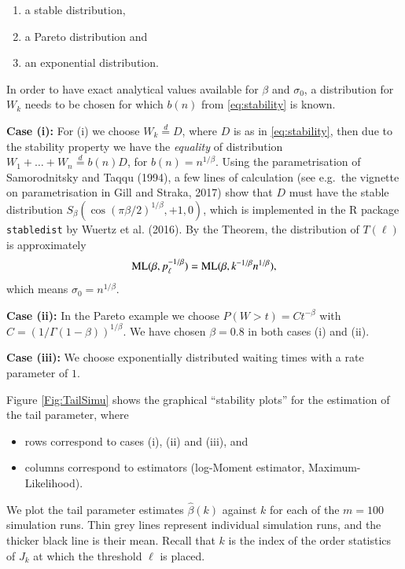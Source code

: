 \documentclass[]{elsarticle} %
\providecommand{\tightlist}{%
  \setlength{\itemsep}{0pt}\setlength{\parskip}{0pt}}
\begin{document}
\begin{enumerate}
\def\labelenumi{(\roman{enumi})}
\item
  a stable distribution,
\item
  a Pareto distribution and
\item
  an exponential distribution.
\end{enumerate}

In order to have exact analytical values available for \(\beta\) and
\(\sigma_0\), a distribution for \(W_k\) needs to be chosen for which
\(b(n)\) from \eqref{eq:stability} is known.

\textbf{Case (i):} For (i) we choose \(W_k \stackrel{d}{=} D\), where
\(D\) is as in \eqref{eq:stability}, then due to the stability property
we have the \emph{equality} of distribution
\(W_1 + \ldots + W_n \stackrel{d}{=} b(n) D\), for
\(b(n) = n^{1/\beta}\). Using the parametrisation of Samorodnitsky and
Taqqu (1994), a few lines of calculation (see e.g.~the vignette on
parametrisation in Gill and Straka, 2017) show that \(D\) must have the
stable distribution \(S_\beta(\cos(\pi \beta/2)^{1/\beta}, +1, 0)\),
which is implemented in the R package \texttt{stabledist} by Wuertz et
al. (2016). By the Theorem, the distribution of \(T(\ell)\) is
approximately \[
{\rm ML}(\beta, p_{\ell}^{-1/\beta}) 
= {\rm ML}(\beta, k^{-1/\beta} n^{1/\beta}),
\] which means \(\sigma_0 = n^{1/\beta}\).

\textbf{Case (ii):} In the Pareto example we choose
\(P(W>t)=Ct^{-\beta}\) with \(C=(1/\Gamma(1-\beta))^{1/\beta}\). We have
chosen \(\beta=0.8\) in both cases (i) and (ii).

\textbf{Case (iii):} We choose exponentially distributed waiting times
with a rate parameter of \(1\).

Figure \ref{Fig:TailSimu} shows the graphical ``stability plots'' for
the estimation of the tail parameter, where

\begin{itemize}
\tightlist
\item
  rows correspond to cases (i), (ii) and (iii), and
\item
  columns correspond to estimators (log-Moment estimator,
  Maximum-Likelihood).
\end{itemize}

We plot the tail parameter estimates \(\hat \beta(k)\) against \(k\) for
each of the \(m=100\) simulation runs. Thin grey lines represent
individual simulation runs, and the thicker black line is their mean.
Recall that \(k\) is the index of the order statistics of \(J_k\) at
which the threshold \(\ell\) is placed.
\end{document}
